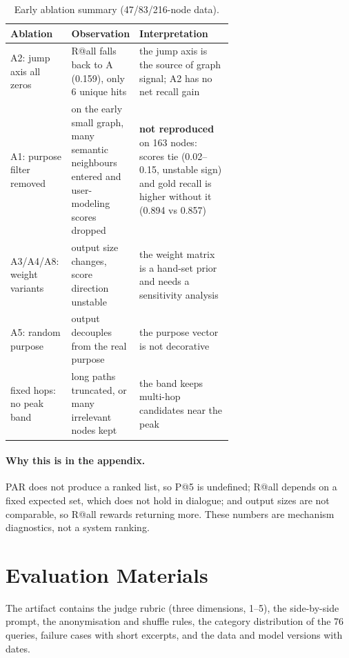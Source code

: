 \documentclass[11pt]{article}
\begin{document}
\begin{table}[ht]
  \centering
  \footnotesize
  \setlength{\tabcolsep}{4pt}
  \begin{tabular}{@{}lp{0.22\linewidth}p{0.42\linewidth}@{}}
    \toprule
    Ablation & Observation & Interpretation \\
    \midrule
    A2: jump axis all zeros & R@all falls back to A (0.159), only 6 unique hits &
      the jump axis is the source of graph signal; A2 has no net recall gain \\
    A1: purpose filter removed & on the early small graph, many semantic neighbours entered and
      user-modeling scores dropped & \textbf{not reproduced} on 163 nodes: scores tie (0.02--0.15,
      unstable sign) and gold recall is higher without it (0.894 vs 0.857) \\
    A3/A4/A8: weight variants & output size changes, score direction unstable &
      the weight matrix is a hand-set prior and needs a sensitivity analysis \\
    A5: random purpose & output decouples from the real purpose & the purpose vector is not
      decorative \\
    fixed hops: no peak band & long paths truncated, or many irrelevant nodes kept &
      the band keeps multi-hop candidates near the peak \\
    \bottomrule
  \end{tabular}
  \caption{Early ablation summary (47/83/216-node data).}\label{tab:oldablation}
\end{table}

\paragraph{Why this is in the appendix.}
PAR does not produce a ranked list, so P@5 is undefined; R@all depends on a fixed expected set,
which does not hold in dialogue; and output sizes are not comparable, so R@all rewards returning
more. These numbers are mechanism diagnostics, not a system ranking.

\section{Evaluation Materials}
\label{app:materials}

The artifact contains the judge rubric (three dimensions, 1--5), the side-by-side prompt, the
anonymisation and shuffle rules, the category distribution of the 76 queries, failure cases with
short excerpts, and the data and model versions with dates.
\end{document}
